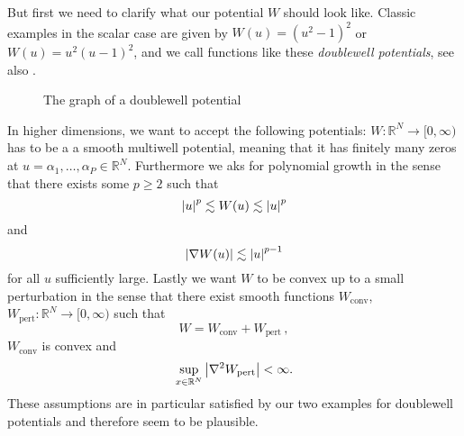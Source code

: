 But first we need to clarify what our potential $ W $ should look like. Classic 
examples in the scalar case are given by $ W ( u ) = \left( u^{ 2 } - 1 
\right)^{ 2 } $ or $ W( u ) = u^{ 2 } ( u - 1 )^{ 2 } $, and we call functions 
like these \emph{doublewell potentials}, see also 
.

\begin{figure}[ht]
	\centering
	\caption{The graph of a doublewell potential}
	\label{graph_of_doublewell_potential}
\end{figure}

In higher dimensions, we want to accept the following potentials: $ W \colon 
\mathbb{ R }^{ N } \to [0, \infty ) $ has to be a a smooth multiwell potential, 
meaning that it has finitely many zeros at $ u = \alpha_{ 1 }, \dotsc , 
\alpha_{ P } \in \mathbb{ R }^{ N } $. Furthermore we aks for polynomial growth 
in the sense that there exists some $ p \geq 2 $ such that
\begin{equation}
	\label{polynomial_growth}
	\abs{ u }^{ p } \lesssim W(u) \lesssim \abs{ u }^{ p }
\end{equation}
and
\begin{equation}
	\label{polynomial_growth_derivative}
	\abs{ \nabla W ( u ) } \lesssim \abs{ u }^{ p -1 }
\end{equation}
for all $ u $ sufficiently large. Lastly we want $ W $ to be convex up to a small perturbation in the sense that there exist smooth functions 
$ W_{ \mathrm{conv} }$, $ W_{ \mathrm{pert} } \colon \mathbb{ R }^{ N } \to [ 0 , \infty ) $ such that
\begin{equation}
	\label{decomposition_of_w}
	W = W_{ \mathrm{conv}} + W_{ \mathrm{pert}}\, ,
\end{equation}
$ W_{ \mathrm{conv} } $ is convex and
\begin{equation}
	\label{perturbation bound}
	\sup_{ x \in \mathbb{ R }^{ N } }
	\abs{ \nabla^{ 2 } W_{ \mathrm{pert} } } < \infty.
\end{equation}
These assumptions are in particular satisfied by our two examples for doublewell potentials and therefore seem to be plausible.

